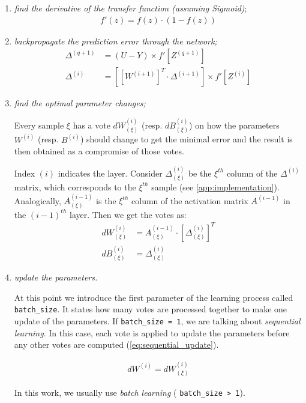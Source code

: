 \begin{enumerate}
\item \textit{find the derivative of the transfer function (assuming Sigmoid)};
\begin{align} \label{eq:transfer_function_der}
f'(z) = f(z) \cdot (1-f(z))
\end{align}
\item \textit{backpropagate the prediction error through the network;}
\begin{align} \label{eq:error_backprop}
\Delta^{(q+1)} &= (U-Y) \times f'[Z^{(q+1)}] \\
\Delta^{(i)} &= \left[\left[W^{(i+1)}\right]^T \cdot \Delta^{(i+1)}\right] \times f'[Z^{(i)}]
\end{align}
\item \textit{find the optimal parameter changes;}

Every sample $ \xi $ has a vote $ dW^{(i)}_{(\xi)} $ (resp. $ dB^{(i)}_{(\xi)} $) on how the parameters $ W^{(i)} $ (resp. $ B^{(i)} $) should change to get the minimal error and the result is then obtained as a compromise of those votes.

Index $ (i) $ indicates the layer. Consider $ \Delta^{(i)}_{(\xi)} $ be the $ \xi^{th} $ column of the $ \Delta^{(i)} $ matrix, which corresponds to the $ \xi^{th} $ sample (see \cref{app:implementation}). Analogically, $ A^{(i-1)}_{(\xi)} $ is the $ \xi^{th} $ column of the activation matrix $ A^{(i-1)} $ in the $ (i-1)^{th} $ layer. Then we get the votes as:
\begin{align} \label{eq:part_derivative}
dW^{(i)}_{(\xi)} &= A^{(i-1)}_{(\xi)} \cdot \left[\Delta^{(i)}_{(\xi)}\right]^T\\
dB^{(i)}_{(\xi)} &= \Delta^{(i)}_{(\xi)}
\end{align}
\item \textit{update the parameters.}

At this point we introduce the first parameter of the learning process called \texttt{batch\_size}. It states how many votes are processed together to make one update of the parameters. If \texttt{batch\_size = 1}, we are talking about \textit{sequential learning}. In this case, each vote is applied to update the parameters before any other votes are computed (\cref{eq:sequential_update}). 

\begin{align} \label{eq:sequential_update}
dW^{(i)} = dW^{(i)}_{(\xi)}
\end{align}

In this work, we usually use \textit{batch learning} ( \texttt{batch\_size > 1}).


\end{enumerate}
